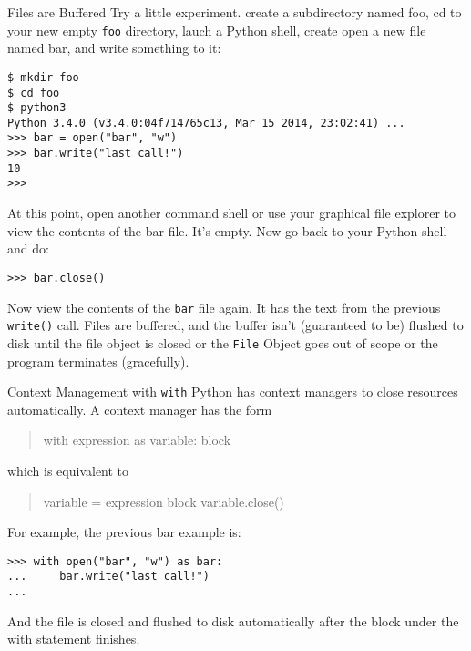 \documentclass[smaller, aspectratio=1610]{beamer}
\begin{document}
\begin{frame}[label={sec:orgbc94b4a},fragile]{Files are Buffered}
 Try a little experiment. create a subdirectory named foo, cd to your new empty \texttt{foo} directory, lauch a Python shell, create open a new file named bar, and write something to it:

\lstset{language=Python,label= ,caption= ,captionpos=b,numbers=none}
\begin{lstlisting}
$ mkdir foo
$ cd foo
$ python3
Python 3.4.0 (v3.4.0:04f714765c13, Mar 15 2014, 23:02:41) ...
>>> bar = open("bar", "w")
>>> bar.write("last call!")
10
>>>
\end{lstlisting}

At this point, open another command shell or use your graphical file
explorer to view the contents of the bar file. It’s empty. Now go back to
your Python shell and do:

\lstset{language=Python,label= ,caption= ,captionpos=b,numbers=none}
\begin{lstlisting}
>>> bar.close()
\end{lstlisting}

Now view the contents of the \texttt{bar} file again. It has the text from the previous \texttt{write()} call. Files are buffered, and the buffer isn’t (guaranteed to be) flushed to disk until the file object is closed or the \texttt{File} Object goes out of scope or the program terminates (gracefully).
\end{frame}

\begin{frame}[label={sec:orgfaee75d},fragile]{Context Management with \texttt{with}}
 Python has context managers to close resources automatically. A context manager has the form

\begin{quote}
\begin{VERBATIM}
with expression as variable:
    block
\end{VERBATIM}
\end{quote}

which is equivalent to

\begin{quote}
\begin{VERBATIM}
variable = expression
block
variable.close()
\end{VERBATIM}
\end{quote}

For example, the previous bar example is:

\lstset{language=Python,label= ,caption= ,captionpos=b,numbers=none}
\begin{lstlisting}
>>> with open("bar", "w") as bar:
...     bar.write("last call!")
...
\end{lstlisting}

And the file is closed and flushed to disk automatically after the block under the with statement finishes.
\end{frame}
\end{document}
